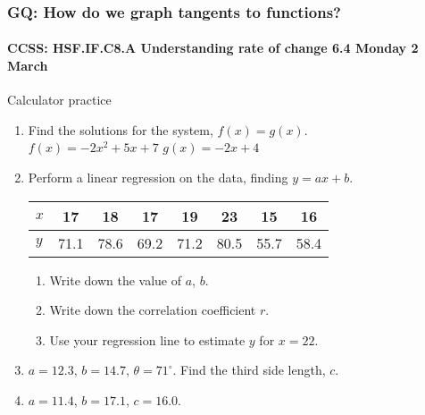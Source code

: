 \documentclass{beamer}
\begin{document}
      \frame
      {
        \frametitle{GQ: How do we graph tangents to functions?}
        \framesubtitle{CCSS: HSF.IF.C8.A Understanding rate of change \hfill \alert{6.4 Monday 2 March}}
        {Calculator practice}
          \begin{enumerate}
            \item Find the solutions for the system, $f(x)=g(x)$.\\
                $f(x)=-2x^2+5x+7$ \qquad $g(x)=-2x+4$ \vspace{0.3cm}
            \item Perform a linear regression on the data, finding $y=ax+b$. 
              \begin{center}
              \begin{tabular}{|l|c|c|c|c|c|c|c|}
                  \hline
                  $x$ & 17 & 18 & 17 & 19 & 23 & 15 & 16 \\ 
                  \hline 
                  $y$ & 71.1 & 78.6 & 69.2 & 71.2 & 80.5 & 55.7 & 58.4 \\ 
                  \hline 
                  \end{tabular}
              \end{center}
              \begin{enumerate}
                  \item Write down the value of $a$, $b$. %
                  \item Write down the correlation coefficient $r$.  %
                  \item Use your regression line to estimate $y$ for $x=22$.  %
              \end{enumerate}
            \item $a=12.3$, $b=14.7$, $\theta = 71^\circ$. Find the third side length, $c$.
            \item $a=11.4$, $b=17.1$, $c=16.0$.
          \end{enumerate}
          }
\end{document}
